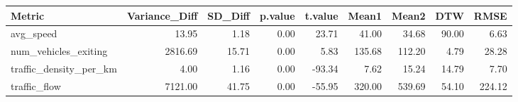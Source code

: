 \begin{table}[ht]
\centering
\begin{tabular}{lrrrrrrrr}
  \hline
Metric & Variance\_Diff & SD\_Diff & p.value & t.value & Mean1 & Mean2 & DTW & RMSE \\ 
  \hline
avg\_speed & 13.95 & 1.18 & 0.00 & 23.71 & 41.00 & 34.68 & 90.00 & 6.63 \\ 
  num\_vehicles\_exiting & 2816.69 & 15.71 & 0.00 & 5.83 & 135.68 & 112.20 & 4.79 & 28.28 \\ 
  traffic\_density\_per\_km & 4.00 & 1.16 & 0.00 & -93.34 & 7.62 & 15.24 & 14.79 & 7.70 \\ 
  traffic\_flow & 7121.00 & 41.75 & 0.00 & -55.95 & 320.00 & 539.69 & 54.10 & 224.12 \\ 
   \hline
\end{tabular}
\end{table}
